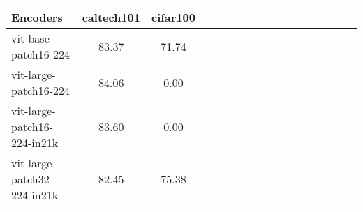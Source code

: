 \begin{tabular}{l cccccccccccccccc}
\toprule
Encoders & caltech101 & cifar100 \\ \hline
vit-base-patch16-224 & 83.37 & 71.74\\
vit-large-patch16-224 & 84.06 & 0.00\\
vit-large-patch16-224-in21k & 83.60 & 0.00\\
vit-large-patch32-224-in21k & 82.45 & 75.38\\
\bottomrule
\end{tabular}
